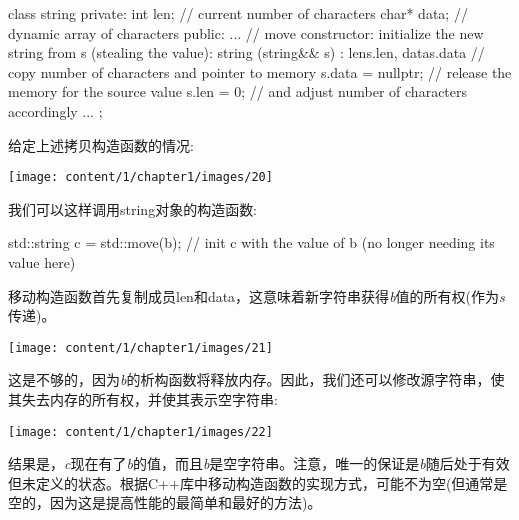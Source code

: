 \begin{cppcode}
class string {
	private:
	int len; // current number of characters
	char* data; // dynamic array of characters
	public:
	...
	// move constructor: initialize the new string from s (stealing the value):
	string (string&& s)
	: len{s.len}, data{s.data} { // copy number of characters and pointer to memory
		s.data = nullptr; // release the memory for the source value
		s.len = 0; // and adjust number of characters accordingly
	}
	...
};
\end{cppcode}

给定上述拷贝构造函数的情况:

\begin{center}
	\texttt{[image: content/1/chapter1/images/20]}
\end{center}

我们可以这样调用string对象的构造函数:

\begin{cppcode}
std::string c = std::move(b); // init c with the value of b (no longer needing its value here)
\end{cppcode}

移动构造函数首先复制成员len和data，这意味着新字符串获得\textit{b}值的所有权(作为\textit{s}传递)。

\begin{center}
	\texttt{[image: content/1/chapter1/images/21]}
\end{center}

这是不够的，因为\textit{b}的析构函数将释放内存。因此，我们还可以修改源字符串，使其失去内存的所有权，并使其表示空字符串:

\begin{center}
	\texttt{[image: content/1/chapter1/images/22]}
\end{center}

结果是，\textit{c}现在有了\textit{b}的值，而且\textit{b}是空字符串。注意，唯一的保证是\textit{b}随后处于有效但未定义的状态。根据C++库中移动构造函数的实现方式，可能不为空(但通常是空的，因为这是提高性能的最简单和最好的方法)。


















